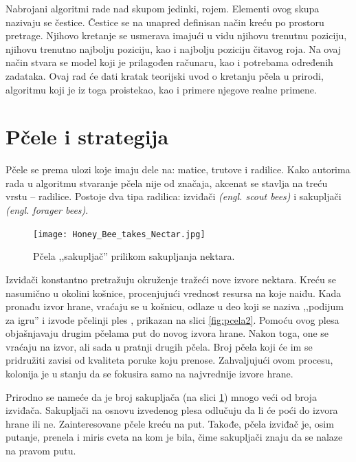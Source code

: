 \documentclass[a4paper]{article}
\begin{document}
{Nabrojani algoritmi rade nad skupom jedinki, rojem. Elementi ovog skupa nazivaju se čestice. Čestice se na unapred definisan način kreću po prostoru pretrage. Njihovo kretanje se usmerava imajući u vidu njihovu trenutnu poziciju, njihovu trenutno najbolju poziciju, kao i najbolju poziciju čitavog roja. Na ovaj način stvara se model koji je prilagođen računaru, kao i potrebama određenih zadataka. 
Ovaj rad će dati kratak teorijski uvod o kretanju pčela u prirodi, algoritmu koji je iz toga proistekao, kao i primere njegove realne primene.


\section{Pčele i strategija}
\label{subsec: ponasanje}
Pčele se prema ulozi koje imaju dele na: matice, trutove i radilice. Kako autorima rada u algoritmu stvaranje pčela nije od značaja, akcenat se stavlja na treću vrstu – radilice. Postoje dva tipa radilica: izviđači {\em(engl. scout bees)} i sakupljači {\em(engl. forager bees)}\cite{istorijat}. 

\begin{figure}[h!]
\begin{center}
\texttt{[image: Honey\_Bee\_takes\_Nectar.jpg]}
\end{center}
\caption{Pčela ,,sakupljač'' prilikom sakupljanja nektara.}

\label{fig:pcela1}
\end{figure}

Izviđači konstantno pretražuju okruženje tražeći nove izvore nektara. Kreću se nasumično u okolini košnice, procenjujući vrednost resursa na koje naiđu. Kada pronađu izvor hrane, vraćaju se u košnicu, odlaze u deo koji se naziva ,,podijum za igru'' i izvode pčelinji ples \cite{plesknjiga}, prikazan na slici \ref{fig:pcela2}. Pomoću ovog plesa objašnjavaju drugim pčelama put do novog izvora hrane. Nakon toga, one se vraćaju na izvor, ali sada u pratnji drugih pčela. Broj pčela koji će im se pridružiti zavisi od kvaliteta poruke koju prenose. Zahvaljujući ovom procesu, kolonija je u stanju da se fokusira samo na najvrednije izvore hrane.

Prirodno se nameće da je broj sakupljača (na slici \ref{fig:pcela1}) mnogo veći od broja izviđača. Sakupljači na osnovu izvedenog plesa odlučuju da li će poći do izvora hrane ili ne. Zainteresovane pčele kreću na put. Takođe, pčela izviđač je, osim putanje, prenela i miris cveta na kom je bila, čime sakupljači znaju da se nalaze na pravom putu.

}
\end{document}
